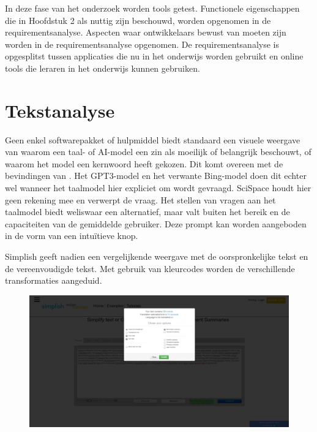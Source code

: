 In deze fase van het onderzoek worden tools getest. Functionele eigenschappen die in Hoofdstuk 2 als nuttig zijn beschouwd, worden opgenomen in de requirementsanalyse. Aspecten waar ontwikkelaars bewust van moeten zijn worden in de requirementsanalyse opgenomen. De requirementsanalyse is opgesplitst tussen applicaties die nu in het onderwijs worden gebruikt en online tools die leraren in het onderwijs kunnen gebruiken.

\section{Tekstanalyse}

Geen enkel softwarepakket of hulpmiddel biedt standaard een visuele weergave van waarom een taal- of AI-model een zin als moeilijk of belangrijk beschouwt, of waarom het model een kernwoord heeft gekozen. Dit komt overeen met de bevindingen van \textcite{Gooding2019}. Het GPT3-model en het verwante Bing-model doen dit echter wel wanneer het taalmodel hier expliciet om wordt gevraagd. SciSpace houdt hier geen rekening mee en verwerpt de vraag. Het stellen van vragen aan het taalmodel biedt weliswaar een alternatief, maar valt buiten het bereik en de capaciteiten van de gemiddelde gebruiker. Deze prompt kan worden aangeboden in de vorm van een intuïtieve knop. 

Simplish geeft nadien een vergelijkende weergave met de oorspronkelijke tekst en de vereenvoudigde tekst. Met gebruik van kleurcodes worden de verschillende transformaties aangeduid.

\begin{figure}[H]
	\includegraphics[width=\linewidth]{img/simplish-input.png}
\end{figure}

